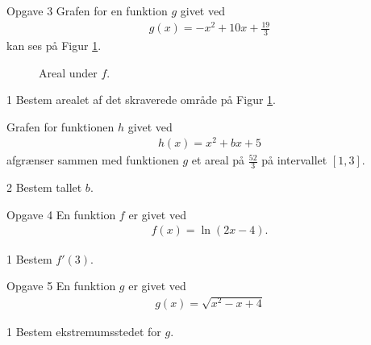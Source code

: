 \begin{opgavetekst}{Opgave 3}
	Grafen for en funktion $g$ givet ved
	\begin{align*}
		g(x) = -x^2 + 10x + \frac{19}{3}
	\end{align*}
	kan ses på Figur \ref{fig:opg3}.
	\begin{figure}[H]
	\centering
	\caption{Areal under $f$.}
	\label{fig:opg3}
	\end{figure}
	\phantom{h}
\end{opgavetekst}
\begin{delopgave}{1}
	Bestem arealet af det skraverede område på Figur \ref{fig:opg3}.
\end{delopgave}
\begin{meretekst}
	Grafen for funktionen $h$ givet ved
	\begin{align*}
		h(x) = x^2 + bx + 5 
	\end{align*}
	afgrænser sammen med funktionen $g$ et areal på $\frac{52}{3}$ på intervallet $[1,3]$. 
\end{meretekst}
\begin{delopgave}{2}
	Bestem tallet $b$.
\end{delopgave}

\begin{opgavetekst}{Opgave 4}
	En funktion $f$ er givet ved
	\begin{align*}
		f(x) = \ln(2x-4).
	\end{align*}
\end{opgavetekst}
\begin{delopgave}{1}
	Bestem $f'(3)$. 
\end{delopgave}

\begin{opgavetekst}{Opgave 5}
	En funktion $g$ er givet ved
	\begin{align*}
		g(x) = \sqrt{x^2-x+4}
	\end{align*}
\end{opgavetekst}
\begin{delopgave}{1}
	Bestem ekstremumsstedet for $g$. 
\end{delopgave}


